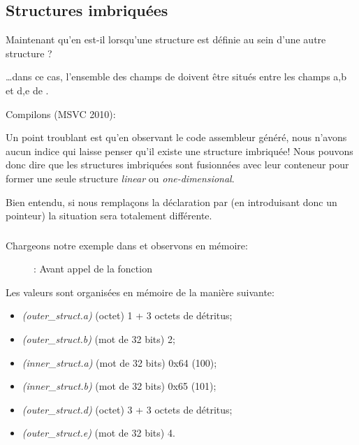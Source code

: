 \subsection{Structures imbriquées}

Maintenant qu'en est-il lorsqu'une structure est définie au sein d'une autre structure ?



\dots dans ce cas, l'ensemble des champs de  doivent être situés entre les champs a,b et 
d,e de .

Compilons (MSVC 2010):



Un point troublant est qu'en observant le code assembleur généré, nous n'avons aucun indice qui laisse penser 
qu'il existe une structure imbriquée!
Nous pouvons donc dire que les structures imbriquées sont fusionnées avec leur conteneur pour former une seule 
structure \emph{linear} ou \emph{one-dimensional}.

Bien entendu, si nous remplaçons la déclaration  par 
(en introduisant donc un pointeur) la situation sera totalement différente.

\clearpage
\subsubsection{\olly}
\myindex{\olly}

Chargeons notre exemple dans \olly et observons  en mémoire:

\begin{figure}[H]
\centering
{}
\caption{\olly: Avant appel de la fonction \printf}
\label{fig:nested_olly}
\end{figure}

Les valeurs sont organisées en mémoire de la manière suivante:
\begin{itemize}
\item \emph{(outer\_struct.a)} (octet) 1 + 3 octets de détritus;
\item \emph{(outer\_struct.b)} (mot de 32 bits) 2;
\item \emph{(inner\_struct.a)} (mot de 32 bits) 0x64 (100);
\item \emph{(inner\_struct.b)} (mot de 32 bits) 0x65 (101);
\item \emph{(outer\_struct.d)} (octet) 3 + 3 octets de détritus;
\item \emph{(outer\_struct.e)} (mot de 32 bits) 4.
\end{itemize}

